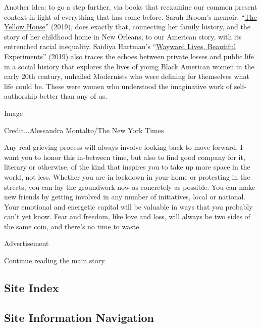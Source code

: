 Another idea: to go a step further, via books that reexamine our common
present context in light of everything that has come before. Sarah
Broom's memoir,
``\href{https://www.nytimes3xbfgragh.onion/2019/08/05/books/review-yellow-house-sarah-broom.html}{The
Yellow House}'' (2019), does exactly that, connecting her family
history, and the story of her childhood home in New Orleans, to our
American story, with its entrenched racial inequality. Saidiya Hartman's
``\href{https://www.nytimes3xbfgragh.onion/2019/02/19/books/wayward-lives-beautiful-experiments-saidiya-hartman.html}{Wayward
Lives, Beautiful Experiments}'' (2019) also traces the echoes between
private losses and public life in a social history that explores the
lives of young Black American women in the early 20th century, unhailed
Modernists who were defining for themselves what life could be. These
were women who understood the imaginative work of self-authorship better
than any of us.

Image

Credit...Alessandra Montalto/The New York Times

Any real grieving process will always involve looking back to move
forward. I want you to honor this in-between time, but also to find good
company for it, literary or otherwise, of the kind that inspires you to
take up more space in the world, not less. Whether you are in lockdown
in your home or protesting in the streets, you can lay the groundwork
now as concretely as possible. You can make new friends by getting
involved in any number of initiatives, local or national. Your emotional
and energetic capital will be valuable in ways that you probably can't
yet know. Fear and freedom, like love and loss, will always be two sides
of the same coin, and there's no time to waste.

Advertisement

\protect\hyperlink{after-bottom}{Continue reading the main story}

\hypertarget{site-index}{%
\subsection{Site Index}\label{site-index}}

\hypertarget{site-information-navigation}{%
\subsection{Site Information
Navigation}\label{site-information-navigation}}

